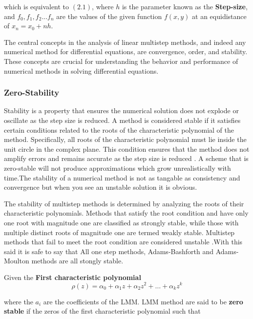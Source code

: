  which is equivalent to $(2.1)$, where $h$ is the parameter known as the \textbf{Step-size}, and $f_0, f_1, f_2 ... f_n$ are the values of the given function $f(x,y)$ at an equidistance of  $x_n = x_0 + nh$.

 The central concepts in the analysis of linear multistep methods, and indeed any numerical method for differential equations, are convergence, order, and stability. These concepts are crucial for understanding the behavior and performance of numerical methods in solving differential equations.

 \subsubsection*{Zero-Stability}
 Stability is a property that ensures the numerical solution does not explode or oscillate as the step size is reduced. A method is considered stable if it satisfies certain conditions related to the roots of the characteristic polynomial of the method. Specifically, all roots of the characteristic polynomial must lie inside the unit circle in the complex plane. This condition ensures that the method does not amplify errors and remains accurate as the step size is reduced \cite{wiki:analysis} \cite{Alexanderian2022}. A scheme that is zero-stable will not produce approximations which grow unrealistically with time.The stability of a numerical method is not as tangable as consistency and convergence but when you see an unstable solution it is obvious.

 The stability of multistep methods is determined by analyzing the roots of their characteristic polynomials. Methods that satisfy the root condition and have only one root with magnitude one are classified as strongly stable, while those with multiple distinct roots of magnitude one are termed weakly stable. Multistep methods that fail to meet the root condition are considered unstable \cite{butler_numerical_2022}.With this said it is safe to say that All one step methods, Adams-Bashforth and Adams-Moulton methods are all stongly stable.

 Given the \textbf{First characteristic polynomial} 
 \begin{equation}
  \rho(z) = \alpha_0 + \alpha_1 z + \alpha_2 z^2 + \dots + \alpha_k z^k
 \end{equation}

 where the $a_i$ are the coefficients of the LMM.
 LMM method are said to be \textbf{zero stable} if the zeros of the first characteristic polynomial such that

